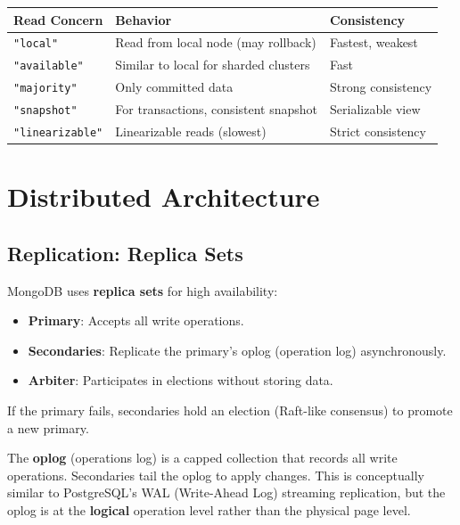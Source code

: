 \documentclass[12pt,a4paper]{article}
\begin{document}
\begin{center}
\begin{tabular}{@{}lll@{}}
\toprule
\textbf{Read Concern} & \textbf{Behavior} & \textbf{Consistency} \\
\midrule
\texttt{"local"} & Read from local node (may rollback) & Fastest, weakest \\
\texttt{"available"} & Similar to local for sharded clusters & Fast \\
\texttt{"majority"} & Only committed data & Strong consistency \\
\texttt{"snapshot"} & For transactions, consistent snapshot & Serializable view \\
\texttt{"linearizable"} & Linearizable reads (slowest) & Strict consistency \\
\bottomrule
\end{tabular}
\end{center}

\section{Distributed Architecture}

\subsection{Replication: Replica Sets}

MongoDB uses \textbf{replica sets} for high availability:

\begin{itemize}[noitemsep]
    \item \textbf{Primary}: Accepts all write operations.
    \item \textbf{Secondaries}: Replicate the primary's oplog (operation log) asynchronously.
    \item \textbf{Arbiter}: Participates in elections without storing data.
\end{itemize}

If the primary fails, secondaries hold an election (Raft-like consensus) to promote a new primary.

\begin{keyinsight}
The \textbf{oplog} (operations log) is a capped collection that records all write operations. Secondaries tail the oplog to apply changes. This is conceptually similar to PostgreSQL's WAL (Write-Ahead Log) streaming replication, but the oplog is at the \textbf{logical} operation level rather than the physical page level.
\end{keyinsight}
\end{document}
